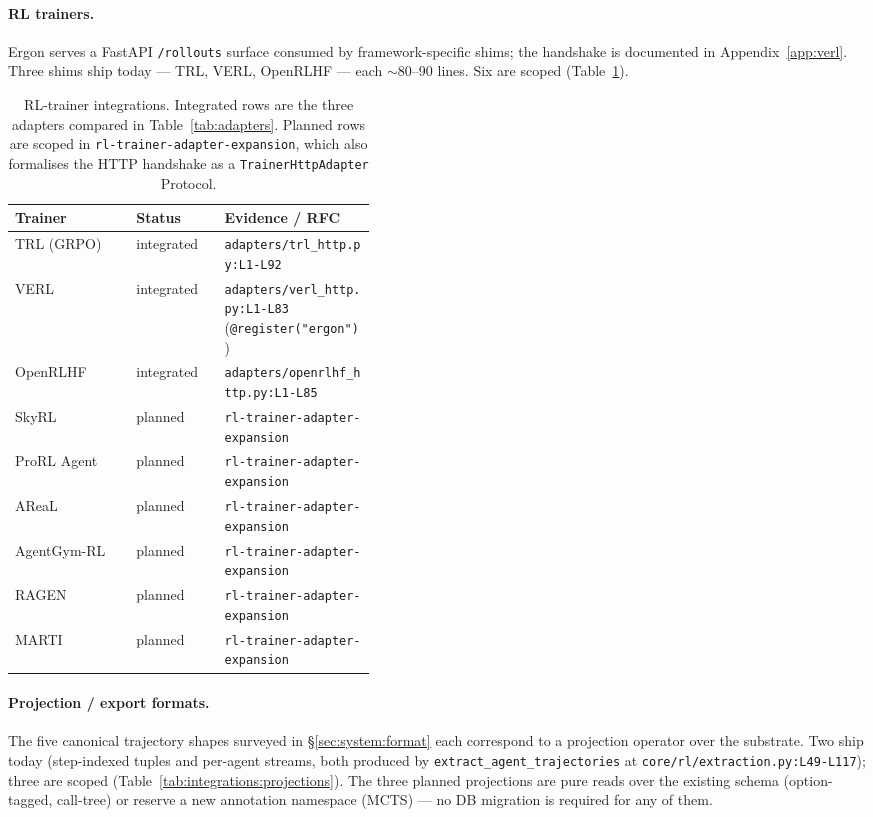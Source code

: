 \documentclass{article}
\begin{document}
\paragraph{RL trainers.} Ergon serves a FastAPI
\texttt{/rollouts} surface consumed by framework-specific
shims; the handshake is documented in Appendix~\ref{app:verl}.
Three shims ship today --- TRL, VERL, OpenRLHF --- each
$\sim$80--90 lines. Six are scoped
(Table~\ref{tab:integrations:trainers}).

\begin{table}[h]
\centering
\small
\setlength{\tabcolsep}{4pt}
\caption{RL-trainer integrations. Integrated rows are the three
adapters compared in Table~\ref{tab:adapters}. Planned rows are
scoped in \texttt{rl-trainer-adapter-expansion}, which also
formalises the HTTP handshake as a \texttt{TrainerHttpAdapter}
\mbox{Protocol}.}
\label{tab:integrations:trainers}
\begin{tabular}{@{}l l >{\raggedright\arraybackslash}p{0.42\linewidth}@{}}
\toprule
\textbf{Trainer} & \textbf{Status} & \textbf{Evidence / RFC} \\
\midrule
TRL (GRPO)   & integrated & \texttt{adapters/trl\_http.py:L1-L92} \\
VERL         & integrated & \texttt{adapters/verl\_http.py:L1-L83} (\texttt{@register("ergon")}) \\
OpenRLHF     & integrated & \texttt{adapters/openrlhf\_http.py:L1-L85} \\
SkyRL        & planned    & \texttt{rl-trainer-adapter-expansion} \\
ProRL Agent  & planned    & \texttt{rl-trainer-adapter-expansion} \\
AReaL        & planned    & \texttt{rl-trainer-adapter-expansion} \\
AgentGym-RL  & planned    & \texttt{rl-trainer-adapter-expansion} \\
RAGEN        & planned    & \texttt{rl-trainer-adapter-expansion} \\
MARTI        & planned    & \texttt{rl-trainer-adapter-expansion} \\
\bottomrule
\end{tabular}
\end{table}

\paragraph{Projection / export formats.} The five canonical
trajectory shapes surveyed in \S\ref{sec:system:format} each
correspond to a projection operator over the substrate. Two
ship today (step-indexed tuples and per-agent streams, both
produced by \texttt{extract\_agent\_trajectories} at
\texttt{core/rl/extraction.py:L49-L117}); three are scoped
(Table~\ref{tab:integrations:projections}). The three planned
projections are pure reads over the existing schema
(option-tagged, call-tree) or reserve a new annotation
namespace (MCTS) --- no DB migration is required for any of
them.
\end{document}
